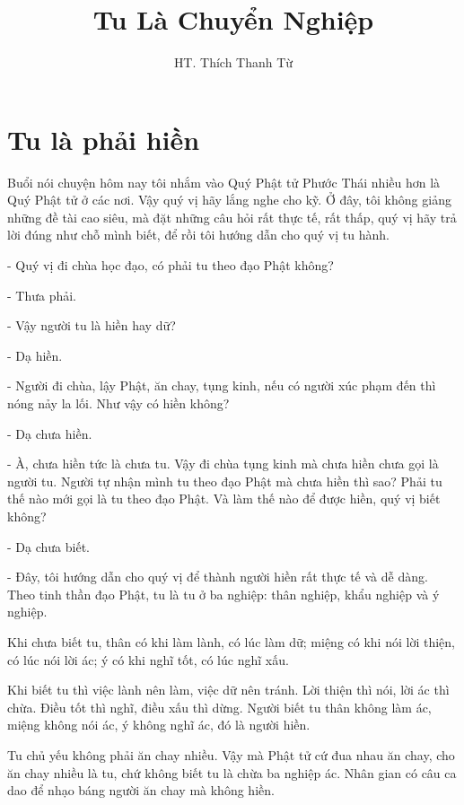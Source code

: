 \documentclass[
  12pt,
  oneside]{book}
\title{Tu Là Chuyển Nghiệp}
\author{HT. Thích Thanh Từ}
\date{}
\begin{document}
\maketitle

{
\setcounter{tocdepth}{1}
\tableofcontents
}
\hypertarget{tu-la-phai-hien}{%
\chapter*{Tu là phải hiền}\label{tu-la-phai-hien}}

Buổi nói chuyện hôm nay tôi nhắm vào Quý Phật tử Phước Thái nhiều hơn là Quý Phật tử ở các nơi. Vậy quý vị hãy lắng nghe cho kỹ. Ở đây, tôi không giảng những đề tài cao siêu, mà đặt những câu hỏi rất thực tế, rất thấp, quý vị hãy trả lời đúng như chỗ mình biết, để rồi tôi hướng dẫn cho quý vị tu hành.

- Quý vị đi chùa học đạo, có phải tu theo đạo Phật không?

- Thưa phải.

- Vậy người tu là hiền hay dữ?

- Dạ hiền.

- Người đi chùa, lậy Phật, ăn chay, tụng kinh, nếu có người xúc phạm đến thì nóng nảy la lối. Như vậy có hiền không?

- Dạ chưa hiền.

- À, chưa hiền tức là chưa tu. Vậy đi chùa tụng kinh mà chưa hiền chưa gọi là người tu. Người tự nhận mình tu theo đạo Phật mà chưa hiền thì sao? Phải tu thế nào mới gọi là tu theo đạo Phật. Và làm thế nào để được hiền, quý vị biết không?

- Dạ chưa biết.

- Đây, tôi hướng dẫn cho quý vị để thành người hiền rất thực tế và dễ dàng. Theo tinh thần đạo Phật, tu là tu ở ba nghiệp: thân nghiệp, khẩu nghiệp và ý nghiệp.

Khi chưa biết tu, thân có khi làm lành, có lúc làm dữ; miệng có khi nói lời thiện, có lúc nói lời ác; ý có khi nghĩ tốt, có lúc nghĩ xấu.

Khi biết tu thì việc lành nên làm, việc dữ nên tránh. Lời thiện thì nói, lời ác thì chừa. Điều tốt thì nghĩ, điều xấu thì dừng. Người biết tu thân không làm ác, miệng không nói ác, ý không nghĩ ác, đó là người hiền.

Tu chủ yếu không phải ăn chay nhiều. Vậy mà Phật tử cứ đua nhau ăn chay, cho ăn chay nhiều là tu, chứ không biết tu là chừa ba nghiệp ác. Nhân gian có câu ca dao để nhạo báng người ăn chay mà không hiền.
\end{document}

